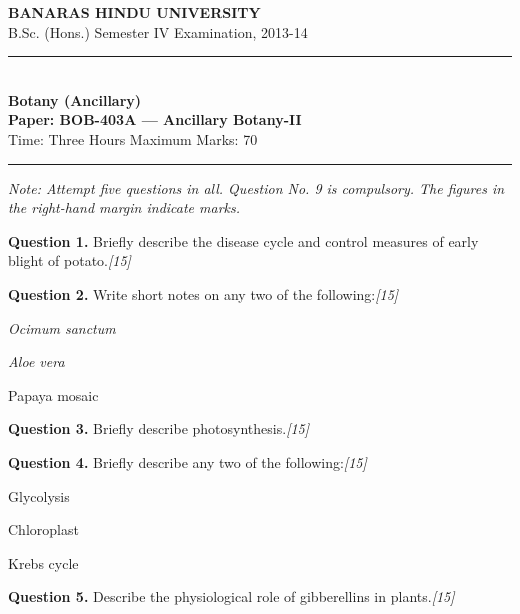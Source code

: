 \documentclass[11pt,a4paper]{article}
\newcommand{\pts}[1]{\hfill   \textit{[#1]}}
\begin{document}
\begin{center}
  {\large\bfseries BANARAS HINDU UNIVERSITY}\\[2pt]
  {\normalsize B.Sc. (Hons.) Semester IV Examination, 2013-14}\\[6pt]
  \rule{0.8\linewidth}{0.5pt}\\[6pt]
  {\large\bfseries Botany (Ancillary)}\\[4pt]
  {\large\bfseries Paper: BOB-403A --- Ancillary Botany-II}\\[4pt]
  {\normalsize Time: Three Hours \hfill Maximum Marks: 70}
\end{center}

\rule{\linewidth}{0.4pt}

\smallskip



\noindent   \textit{Note: Attempt five questions in all. Question No. 9 is compulsory. The figures in the right-hand margin indicate marks.}

\bigskip

\medskip


\noindent   \textbf{Question 1.} Briefly describe the disease cycle and control measures of early blight of potato.\pts{15}

\medskip


\noindent   \textbf{Question 2.} Write short notes on any two of the following:\pts{15}

\begin{parts}
  \item   \textit{Ocimum sanctum}
  \item   \textit{Aloe vera}
  \item Papaya mosaic
\end{parts}

\medskip


\noindent   \textbf{Question 3.} Briefly describe photosynthesis.\pts{15}

\medskip


\noindent   \textbf{Question 4.} Briefly describe any two of the following:\pts{15}

\begin{parts}
  \item Glycolysis
  \item Chloroplast
  \item Krebs cycle
\end{parts}

\medskip


\noindent   \textbf{Question 5.} Describe the physiological role of gibberellins in plants.\pts{15}
\end{document}

